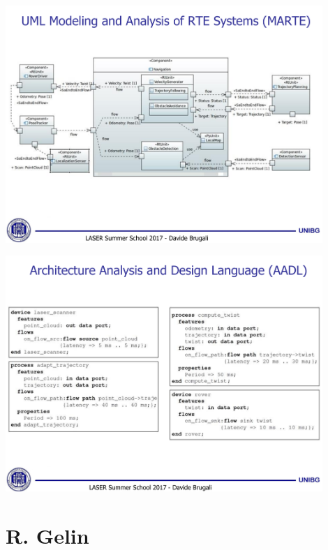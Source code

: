 \documentclass[xetex,mathserif,serif]{beamer}
\begin{document}
	\begin{frame}
		\begin{center}
			\includegraphics[width=0.9\textwidth]{brugali18.png}
		\end{center}
	\end{frame}

	\begin{frame}
		\begin{center}
			\includegraphics[width=0.9\textwidth]{brugali19.png}
		\end{center}
	\end{frame}

	\section{R. Gelin}
\end{document}
